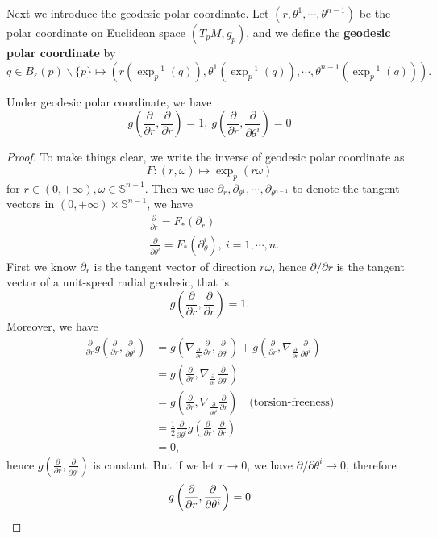 Next we introduce the geodesic polar coordinate.
Let $(r,\theta^1,\cdots,\theta^{n-1})$ be the polar coordinate on Euclidean space $(T_pM,g_p)$, and we define the \textbf{geodesic polar coordinate} by
\[q\in B_\varepsilon(p)\backslash\{p\}\mapsto(r(\exp_p^{-1}(q)),\theta^1(\exp_p^{-1}(q)),\cdots,\theta^{n-1}(\exp_p^{-1}(q))).\]

\begin{prop}
    Under geodesic polar coordinate, we have
    \[g\left(\frac{\partial{}}{\partial{r}},\frac{\partial{}}{\partial{r}}\right)=1,\ g\left(\frac{\partial{}}{\partial{r}},\frac{\partial{}}{\partial{\theta^i}}\right)=0\]
\end{prop}
\begin{proof}
    To make things clear, we write the inverse of geodesic polar coordinate as
    \[F:(r,\omega)\mapsto\exp_p(r\omega)\]
    for $r\in(0,+\infty),\omega\in\mathbb{S}^{n-1}$.
    Then we use $\partial_r,\partial_{\theta^1},\cdots,\partial_{\theta^{n-1}}$ to denote the tangent vectors in $(0,+\infty)\times\mathbb{S}^{n-1}$, we have
    \begin{align*}
        &\frac{\partial{}}{\partial{r}}=F_*(\partial_r)\\
        &\frac{\partial{}}{\partial{\theta^i}}=F_*(\partial_\theta^i),\ i=1,\cdots,n.
    \end{align*}
    First we know $\partial_r$ is the tangent vector of direction $r\omega$, hence $\partial{}/\partial{r}$ is the tangent vector of a unit-speed radial geodesic, that is
    \[g\left(\frac{\partial{}}{\partial{r}},\frac{\partial{}}{\partial{r}}\right)=1.\]
    Moreover, we have
    \begin{align*}
        \frac{\partial{}}{\partial{r}}g\left(\frac{\partial{}}{\partial{r}},\frac{\partial{}}{\partial{\theta^i}}\right)&=g\left(\nabla_{\frac{\partial{}}{\partial{r}}}\frac{\partial{}}{\partial{r}},\frac{\partial{}}{\partial{\theta^i}}\right)+g\left(\frac{\partial{}}{\partial{r}},\nabla_{\frac{\partial{}}{\partial{r}}}\frac{\partial{}}{\partial{\theta^i}}\right)\\
        &=g\left(\frac{\partial{}}{\partial{r}},\nabla_{\frac{\partial{}}{\partial{r}}}\frac{\partial{}}{\partial{\theta^i}}\right)\\
        &=g\left(\frac{\partial{}}{\partial{r}},\nabla_{\frac{\partial{}}{\partial{\theta^i}}}\frac{\partial{}}{\partial{r}}\right)\quad\text{(torsion-freeness)}\\
        &=\frac{1}{2}\frac{\partial{}}{\partial{\theta^i}}g\left(\frac{\partial{}}{\partial{r}},\frac{\partial{}}{\partial{r}}\right)\\
        &=0,
    \end{align*}
    hence $g\left(\frac{\partial{}}{\partial{r}},\frac{\partial{}}{\partial{\theta^i}}\right)$ is constant.
    But if we let $r\to 0$, we have $\partial{}/\partial{\theta^i}\to 0$, therefore
    \[g\left(\frac{\partial{}}{\partial{r}},\frac{\partial{}}{\partial{\theta^i}}\right)=0\qedhere\]
\end{proof}

